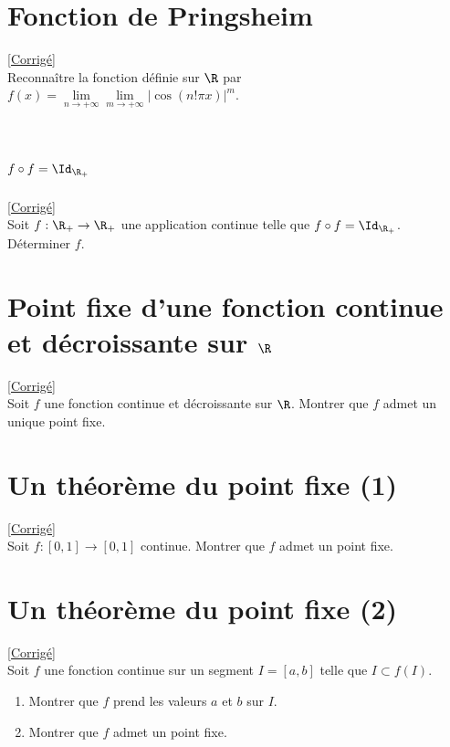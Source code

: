\documentclass{book}
\begin{document}
	\section{Fonction de Pringsheim }
	\textcolor{blue}{\hyperref[Fonction de Pringsheim corrigé]{[Corrigé]}}\\
	\label{Fonction de Pringsheim}
	Reconnaître la fonction définie sur $\R$ par $f(x)=\lim\limits_{n\to+\infty} \lim\limits_{m\to+\infty} |\cos(n!\pi x)|^m$.
	
	\section{$f\circ f=\Id_{\R_+}$ }
	\textcolor{blue}{\hyperref[fof=Id corrigé]{[Corrigé]}}\\
	\label{fof=Id}
	Soit $f:\R_+\to\R_+$ une application continue telle que $f\circ f=\Id_{\R_+}$. Déterminer $f$.
	
	\section{Point fixe d'une fonction continue et décroissante sur $\R$ }
	\textcolor{blue}{\hyperref[Point fixe d'une fonction continue et décroissante sur R corrigé]{[Corrigé]}}\\
	\label{Point fixe d'une fonction continue et décroissante sur R}
	Soit $f$ une fonction continue et décroissante sur $\R$. Montrer que $f$ admet un unique point fixe.
	
	\section{Un théorème du point fixe (1) }
	\textcolor{blue}{\hyperref[Un théorème du point fixe (1) corrigé]{[Corrigé]}}\\
	\label{Un théorème du point fixe (1)}
	Soit $f:[0,1]\to [0,1]$ continue. Montrer que $f$ admet un point fixe.
	
	\section{Un théorème du point fixe (2) }
	\textcolor{blue}{\hyperref[Un théorème du point fixe (2) corrigé]{[Corrigé]}}\\
	\label{Un théorème du point fixe (2)}
	Soit $f$ une fonction  continue sur un segment $I=[a,b]$ telle que $I\subset f(I)$.
	\begin{enumerate}
		\item Montrer que $f$ prend les valeurs $a$ et $b$ sur $I$.
		\item Montrer que $f$ admet un point fixe.
	\end{enumerate}
	
\end{document}
